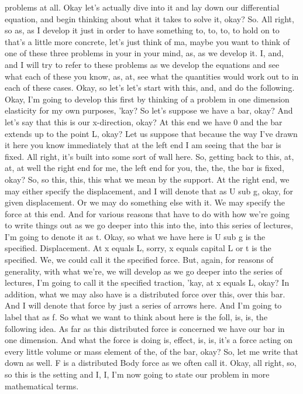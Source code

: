 \documentclass[10pt]{article}
\begin{document}
problems at all. Okay let's actually dive into it and lay down our differential equation, and begin thinking about what it takes to solve it, okay? So. All right, so as, as I develop it just in order to have something to, to, to, to hold on to that's a little more concrete, let's just think of ma, maybe you want to think of one of these three problems in your in your mind, as, as we develop it. I, and, and I will try to refer to these problems as we develop the equations and see what each of these you know, as, at, see what the quantities would work out to in each of these cases. Okay, so let's let's start with this, and, and do the following. Okay, I'm going to develop this first by thinking of a problem in one dimension elasticity for my own purposes, 'kay? So let's suppose we have a bar, okay? And let's say that this is our x-direction, okay? At this end we have 0 and the bar extends up to the point L, okay? Let us suppose that because the way I've drawn it here you know immediately that at the left end I am seeing that the bar is fixed. All right, it's built into some sort of wall here. So, getting back to this, at, at, at well the right end for me, the left end for you, the, the, the bar is fixed, okay? So, so this, this, this what we mean by the support. At the right end, we may either specify the displacement, and I will denote that as U sub g, okay, for given displacement. Or we may do something else with it. We may specify the force at this end. And for various reasons that have to do with how we're going to write things out as we go deeper into this into the, into this series of lectures, I'm going to denote it as t. Okay, so what we have here is U sub g is the specified. Displacement. At x equals L, sorry, x equals capital L or t is the specified. We, we could call it the specified force. But, again, for reasons of generality, with what we're, we will develop as we go deeper into the series of lectures, I'm going to call it the specified traction, 'kay, at x equals L, okay? In addition, what we may also have is a distributed force over this, over this bar. And I will denote that force by just a series of arrows here. And I'm going to label that as f. So what we want to think about here is the foll, is, is, the following idea. As far as this distributed force is concerned we have our bar in one dimension. And what the force is doing is, effect, is, is, it's a force acting on every little volume or mass element of the, of the bar, okay? So, let me write that down as well. F is a distributed Body force as we often call it. Okay, all right, so, so this is the setting and I, I, I'm now going to state our problem in more mathematical terms.
\end{document}

